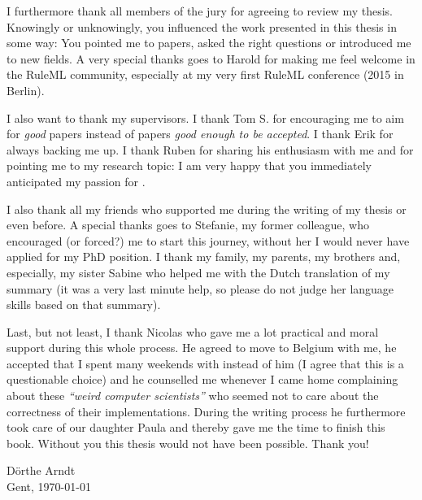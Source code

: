 I furthermore thank all members of the jury for agreeing to review my thesis. 
Knowingly or unknowingly, you influenced the work presented in this thesis in some way:
You pointed me to papers, asked the right questions or introduced me to new fields.  
A very special thanks goes to Harold for making me feel welcome in the RuleML community, especially at my very first RuleML conference (2015 in Berlin).  
 
I also want to thank my supervisors.
I thank Tom S. for encouraging me to aim for \emph{good} papers instead of papers \emph{good enough to be accepted}.
I thank Erik for always backing me up. I thank Ruben for sharing his enthusiasm with me and for pointing me to my research topic:
I am very happy that you immediately anticipated my passion for \nthreelogic.  

I also thank all my friends who supported me during the writing of my thesis or even before. 
A special thanks goes to Stefanie, my former colleague, who encouraged (or forced?) me to start this journey, without her I would never have applied for my PhD position.
I thank my family, my parents, my brothers and, especially, my sister Sabine who helped me with the Dutch translation of my summary (it was a very last minute help, so please do not judge her language skills based on that summary).

Last, but not least, I thank Nicolas who gave me a lot practical and moral support during this whole process. He agreed to move to Belgium with me,  he accepted that I spent many weekends with \nthree instead of him 
(I agree that this is a questionable choice)
and he counselled me whenever I came home complaining about these \emph{``weird computer scientists''} who seemed not to care about the correctness of their implementations. %
During the writing process he furthermore took care of our daughter Paula and thereby gave me the time to finish this book. 
Without you this thesis would not have been possible.
Thank you!

\vspace*{\fill}

\begin{flushright}
D\"orthe Arndt \\
Gent, \today
\end{flushright}

\vspace*{\fill}




